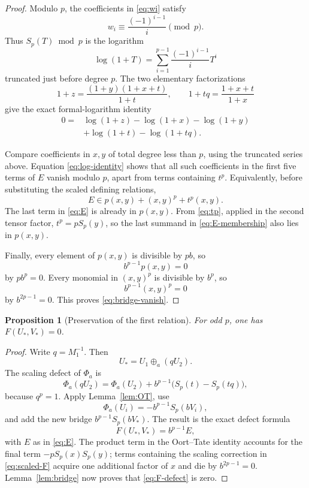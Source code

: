 \documentclass[11pt]{amsart}
\newtheorem{proposition}[theorem]{Proposition}
\theoremstyle{definition}
\theoremstyle{remark}
\begin{document}
\begin{proof}
Modulo \(p\), the coefficients in \eqref{eq:wi} satisfy
\[
 w_i\equiv\frac{(-1)^{i-1}}{i}\pmod p.
\]
Thus \(S_p(T)\bmod p\) is the logarithm
\[
 \log(1+T)=\sum_{i=1}^{p-1}
             \frac{(-1)^{i-1}}{i}T^i
\]
truncated just before degree \(p\).  The two elementary factorizations
\begin{equation}\label{eq:cross-ratio}
 1+z=\frac{(1+y)(1+x+t)}{1+t},
 \qquad
 1+tq=\frac{1+x+t}{1+x}
\end{equation}
give the exact formal-logarithm identity
\begin{equation}\label{eq:log-identity}
 \begin{split}
 0={}&\log(1+z)-\log(1+x)-\log(1+y)\\
    &+\log(1+t)-\log(1+tq).
 \end{split}
\end{equation}

Compare coefficients in \(x,y\) of total degree less than \(p\), using
the truncated series above.  Equation \eqref{eq:log-identity} shows
that all such coefficients in the first five terms of \(E\) vanish
modulo \(p\), apart from terms containing \(t^p\).  Equivalently,
before substituting the scaled defining relations,
\begin{equation}\label{eq:E-membership}
 E\in p(x,y)+(x,y)^p+t^p(x,y).
\end{equation}
The last term in \eqref{eq:E} is already in \(p(x,y)\).  From
\eqref{eq:tp}, applied in the second tensor factor,
\(t^p=pS_p(y)\), so the last summand in
\eqref{eq:E-membership} also lies in \(p(x,y)\).

Finally, every element of \(p(x,y)\) is divisible by \(pb\), so
\[
 b^{p-1}p(x,y)=0
\]
by \(pb^p=0\).  Every monomial in \((x,y)^p\) is divisible by \(b^p\),
so
\[
 b^{p-1}(x,y)^p=0
\]
by \(b^{2p-1}=0\).  This proves \eqref{eq:bridge-vanish}.
\end{proof}

\begin{proposition}[Preservation of the first relation]
\label{prop:F-closes}
For odd \(p\), one has \(F(U_*,V_*)=0\).
\end{proposition}

\begin{proof}
Write \(q=M_1^{-1}\).  Then
\[
 U_*=U_1\oplus_a(qU_2).
\]
The scaling defect of \(\Phi_a\) is
\begin{equation}\label{eq:scaled-F}
 \Phi_a(qU_2)
 =\Phi_a(U_2)+b^{p-1}\bigl(S_p(t)-S_p(tq)\bigr),
\end{equation}
because \(q^p=1\).  Apply Lemma~\ref{lem:OT}, use
\[
 \Phi_a(U_i)=-b^{p-1}S_p(bV_i),
\]
and add the new bridge \(b^{p-1}S_p(bV_*)\).  The result is the exact
defect formula
\begin{equation}\label{eq:F-defect}
 F(U_*,V_*)=b^{p-1}E,
\end{equation}
with \(E\) as in \eqref{eq:E}.  The product term in the Oort--Tate
identity accounts for the final term
\(-pS_p(x)S_p(y)\); terms containing the scaling correction in
\eqref{eq:scaled-F} acquire one additional factor of \(x\) and die by
\(b^{2p-1}=0\).  Lemma~\ref{lem:bridge} now proves that
\eqref{eq:F-defect} is zero.
\end{proof}
\end{document}
